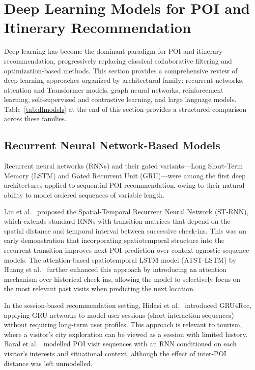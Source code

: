 \section{Deep Learning Models for POI and Itinerary Recommendation}
\label{sec:sota-dl}

Deep learning has become the dominant paradigm for POI and itinerary recommendation, progressively replacing classical collaborative filtering and optimization-based methods. This section provides a comprehensive review of deep learning approaches organized by architectural family: recurrent networks, attention and Transformer models, graph neural networks, reinforcement learning, self-supervised and contrastive learning, and large language models. Table~\ref{tab:dlmodels} at the end of this section provides a structured comparison across these families.



\subsection{Recurrent Neural Network-Based Models}
\label{sec:sota-dl-rnn}

Recurrent neural networks (RNNs) and their gated variants---Long Short-Term Memory (LSTM) and Gated Recurrent Unit (GRU)---were among the first deep architectures applied to sequential POI recommendation, owing to their natural ability to model ordered sequences of variable length.

Liu et al.~\cite{liu2016strnn} proposed the Spatial-Temporal Recurrent Neural Network (ST-RNN), which extends standard RNNs with transition matrices that depend on the spatial distance and temporal interval between successive check-ins. This was an early demonstration that incorporating spatiotemporal structure into the recurrent transition improves next-POI prediction over context-agnostic sequence models. The attention-based spatiotemporal LSTM model (ATST-LSTM) by Huang et al.~\cite{huang2019atstlstm} further enhanced this approach by introducing an attention mechanism over historical check-ins, allowing the model to selectively focus on the most relevant past visits when predicting the next location.

In the session-based recommendation setting, Hidasi et al.~\cite{hidasi2016gru4rec} introduced GRU4Rec, applying GRU networks to model user sessions (short interaction sequences) without requiring long-term user profiles. This approach is relevant to tourism, where a visitor's city exploration can be viewed as a session with limited history. Baral et al.~\cite{baral2018capsrnn} modelled POI visit sequences with an RNN conditioned on each visitor's interests and situational context, although the effect of inter-POI distance was left unmodelled.

